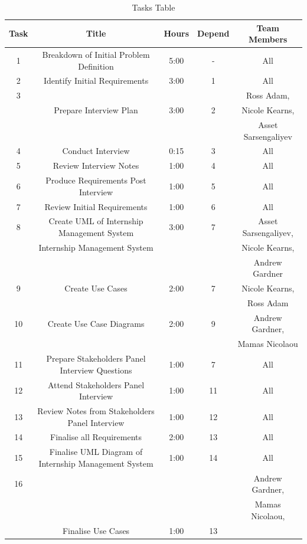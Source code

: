 \documentclass{l3deliverable}
\begin{document}
{\begin{table}
\caption{Tasks Table} %
\begin{tabular}{|c |c |c |c |c |} %
\hline\hline                        %
Task & Title & Hours & Depend & Team Members \\ [0.5ex]
\hline1 & Breakdown of Initial Problem Definition & 5:00 &-& All\\ %
\hline2 & Identify Initial Requirements & 3:00 &1& All\\
\hline3 & &  & & Ross Adam, \\
 &  Prepare Interview Plan&3:00 &2 &Nicole Kearns, \\
 & & & &Asset Sarsengaliyev \\
\hline4 & Conduct Interview & 0:15 &3& All\\
\hline5 & Review Interview Notes& 1:00 &4& All\\
\hline6 & Produce Requirements Post Interview & 1:00 &5& All\\
\hline7 & Review Initial Requirements & 1:00 &6& All \\
\hline8 & Create UML of Internship Management System & 3:00 &7 &Asset Sarsengaliyev, \\
&Internship Management System& & &Nicole Kearns,  \\
& & & & Andrew Gardner \\
\hline9  & Create Use Cases & 2:00&7 &Nicole Kearns,\\
 & & & & Ross Adam \\
\hline10  & Create Use Case Diagrams &2:00 &9 &  Andrew Gardner, \\
 & & & & Mamas Nicolaou \\
\hline11 & Prepare Stakeholders Panel Interview Questions & 1:00 &7& All\\
\hline12 & Attend Stakeholders Panel Interview & 1:00 &11& All\\
\hline13 & Review Notes from Stakeholders Panel Interview & 1:00 &12& All\\
\hline14 & Finalise all Requirements & 2:00 &13& All\\
\hline15 & Finalise UML Diagram of Internship Management System & 1:00 &14& All\\
\hline16 & &  & & Andrew Gardner, \\
 & & & & Mamas Nicolaou, \\
 & Finalise Use Cases & 1:00& 13& \\

\end{tabular}
\end{table}}
\end{document}
